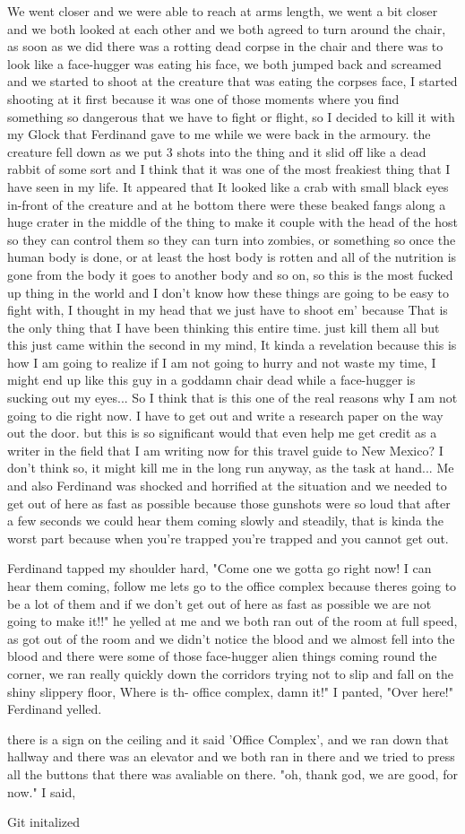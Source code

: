 \documentclass[14pt,letterpaper]{book}
\begin{document}
We went closer and we were able to reach at arms length, we went a bit closer and we both looked at each other and we both agreed to turn around the chair, as soon as we did there was a rotting dead corpse in the chair and there was to look like a face-hugger was eating his face, we both jumped back and screamed and we started to shoot at the creature that was eating the corpses face, I started shooting at it first because it was one of those moments where you find something so dangerous that we have to fight or flight, so I decided to kill it with my Glock that Ferdinand gave to me while we were back in the armoury. the creature fell down as we put 3 shots into the thing and it slid off like a dead rabbit of some sort and I think that it was one of the most freakiest thing that I have seen in my life. It appeared that It looked like a crab with small black eyes in-front of the creature and at he bottom there were these beaked fangs along a huge crater in the middle of the thing to make it couple with the head of the host so they can control them so they can turn into zombies, or something so once the human body  is done, or at least the host body is rotten and all of the nutrition is gone from the body it goes to another body and so on, so this is the most fucked up thing in the world and I don't know how these things are going to be easy to fight with, I thought in my head that we just have to shoot em' because That is the only thing that I have been thinking this entire time. just kill them all but this just came within the second in my mind, It kinda a revelation because this is how I am going to realize if I am not going to hurry and not waste my time, I might end up like this guy in a goddamn chair dead while a face-hugger is sucking out my eyes... So I think that is this one of the real reasons why I am not going to die right now. I have to get out and write a research paper on the way out the door. but this is so significant would that even help me get credit as a writer in the field that I am writing now for this travel guide to New Mexico? I don't think so, it might kill me in the long run anyway, as the task at hand... Me and also Ferdinand was shocked and horrified at the situation and we needed to get out of here as fast as possible because those gunshots were so loud that after a few seconds we could hear them coming slowly and steadily, that is kinda the worst part because when you're trapped you're trapped and you cannot get out.

Ferdinand tapped my shoulder hard, "Come one we gotta go right now! I can hear them coming, follow me lets go to the office complex because theres going to be a lot of them and if we don't get out of here as fast as possible we are not going to make it!!" he yelled at me and we both ran out of the room at full speed, as got out of the room and we didn't notice the blood and we almost fell into the blood and there were some of those face-hugger alien things coming round the corner, we ran really quickly down the corridors trying not to slip and fall on the shiny slippery floor, Where is th- office complex, damn it!" I panted, "Over here!" Ferdinand yelled.

there is a sign on the ceiling and it said 'Office Complex', and we ran down that hallway and there was an elevator and we both ran in there and we tried to press all the buttons that there was avaliable on there. "oh, thank god, we are good, for now." I said, 

Git initalized
\end{document}
